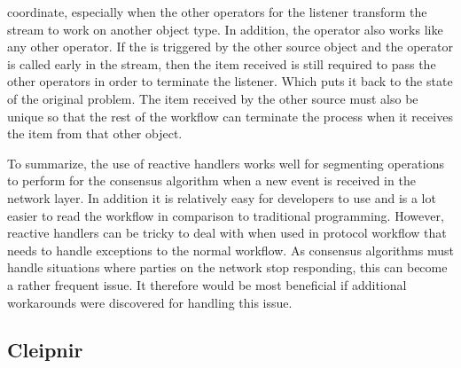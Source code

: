 coordinate, especially when the other operators for the listener transform the stream to work on another object type. In addition, the  operator also works like any other operator. If the  is triggered by the other source object and the operator is called early in the stream, then the item received is still required to pass the other operators in order to terminate the listener. Which puts it back to the state of the original problem. The item received by the other source must also be unique so that the rest of the workflow can terminate the process when it receives the item from that other  object.
\fi

To summarize, the use of reactive handlers works well for segmenting operations to perform for the consensus algorithm when a new event is received in the network layer. In addition it is relatively easy for developers to use and is a lot easier to read the workflow in comparison to traditional programming. However, reactive handlers can be tricky to deal with when used in protocol workflow that needs to handle exceptions to the normal workflow. As consensus algorithms must handle situations where parties on the network stop responding, this can become a rather frequent issue. It therefore would be most beneficial if additional workarounds were discovered for handling this issue.  

\subsection{Cleipnir}


